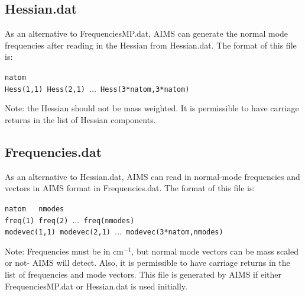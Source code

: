 \documentclass[11pt]{article}
\begin{document}
\clearpage
\newpage

\subsection{Hessian.dat\label{aims:hessian}}
As an alternative to FrequenciesMP.dat, AIMS can generate the normal mode frequencies after reading in the Hessian from Hessian.dat.
The format of this file is:

{\tt natom}\\
{\tt Hess(1,1) Hess(2,1) $\ldots$ Hess(3*natom,3*natom)}

Note: the Hessian should not be mass weighted. It is permissible to have carriage returns in the list of 
Hessian components.

\subsection{Frequencies.dat\label{aims:frequencies}}
As an alternative to Hessian.dat, AIMS can read in normal-mode frequencies and vectors in AIMS format in
Frequencies.dat.
The format of this file is:

{\tt natom \ \  nmodes}\\
{\tt freq(1) freq(2) $\ldots$ freq(nmodes)}\\
{\tt modevec(1,1) modevec(2,1) $\ldots$ modevec(3*natom,nmodes)}

Note: Frequencies must be in cm$^{-1}$, but normal mode vectors can be mass scaled or not- AIMS 
will detect. Also, it is permissible to have carriage returns in the list of frequencies and mode vectors.
This file is generated by AIMS if either FrequenciesMP.dat or Hessian.dat is used initially.



\end{document}
